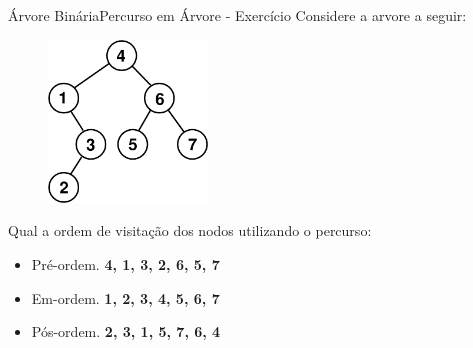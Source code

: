 \documentclass[aspectratio=169]{beamer}
\begin{document}
\begin{frame}{Árvore Binária}{Percurso em Árvore - Exercício}
Considere a arvore a seguir:
\begin{figure}[!h]
  \centering
  \includegraphics[width=120pt]{imagens/exercicio1.png}
\end{figure}
Qual a ordem de visitação dos nodos utilizando o percurso:
\begin{itemize}
 \item Pré-ordem. {\bf 4, 1, 3, 2, 6, 5, 7}
 \item Em-ordem. {\bf 1, 2, 3, 4, 5, 6, 7}
 \item Pós-ordem. {\bf 2, 3, 1, 5, 7, 6, 4}
\end{itemize}
\end{frame}



%
\end{document}
